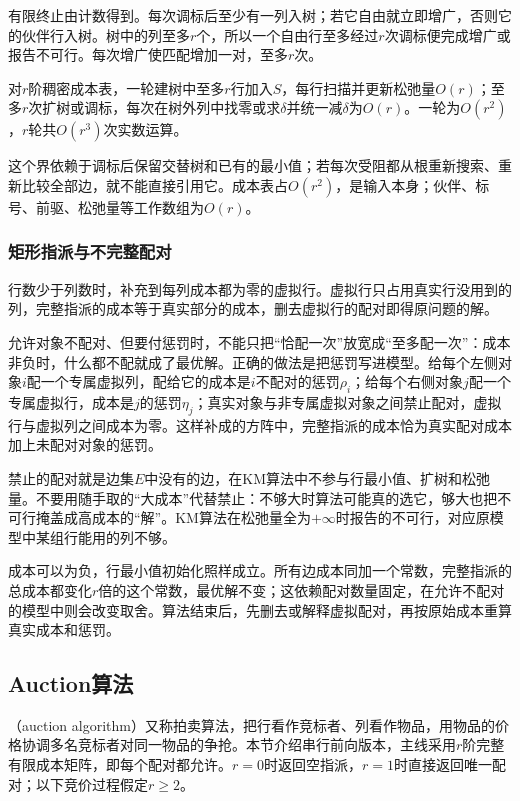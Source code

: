 有限终止由计数得到。每次调标后至少有一列入树；若它自由就立即增广，否则它的伙伴行入树。树中的列至多$r$个，所以一个自由行至多经过$r$次调标便完成增广或报告不可行。每次增广使匹配增加一对，至多$r$次。

对$r$阶稠密成本表，一轮建树中至多$r$行加入$S$，每行扫描并更新松弛量$O(r)$；至多$r$次扩树或调标，每次在树外列中找零或求$\delta$并统一减$\delta$为$O(r)$。一轮为$O(r^2)$，$r$轮共$O(r^3)$次实数运算。

这个界依赖于调标后保留交替树和已有的最小值；若每次受阻都从根重新搜索、重新比较全部边，就不能直接引用它。成本表占$O(r^2)$，是输入本身；伙伴、标号、前驱、松弛量等工作数组为$O(r)$。

\subsubsection{矩形指派与不完整配对}
\label{sec:graph-opt-assign-rectangular}

行数少于列数时，补充到每列成本都为零的虚拟行。虚拟行只占用真实行没用到的列，完整指派的成本等于真实部分的成本，删去虚拟行的配对即得原问题的解。

允许对象不配对、但要付惩罚时，不能只把“恰配一次”放宽成“至多配一次”：成本非负时，什么都不配就成了最优解。正确的做法是把惩罚写进模型。给每个左侧对象$i$配一个专属虚拟列，配给它的成本是$i$不配对的惩罚$\rho_i$；给每个右侧对象$j$配一个专属虚拟行，成本是$j$的惩罚$\eta_j$；真实对象与非专属虚拟对象之间禁止配对，虚拟行与虚拟列之间成本为零。这样补成的方阵中，完整指派的成本恰为真实配对成本加上未配对对象的惩罚。

禁止的配对就是边集$E$中没有的边，在KM算法中不参与行最小值、扩树和松弛量。不要用随手取的“大成本”代替禁止：不够大时算法可能真的选它，够大也把不可行掩盖成高成本的“解”。KM算法在松弛量全为$+\infty$时报告的不可行，对应原模型中某组行能用的列不够。

成本可以为负，行最小值初始化照样成立。所有边成本同加一个常数，完整指派的总成本都变化$r$倍的这个常数，最优解不变；这依赖配对数量固定，在允许不配对的模型中则会改变取舍。算法结束后，先删去或解释虚拟配对，再按原始成本重算真实成本和惩罚。

\subsection{Auction算法}
\label{sec:graph-opt-auction}

（auction algorithm）又称拍卖算法，把行看作竞标者、列看作物品，用物品的价格协调多名竞标者对同一物品的争抢。本节介绍串行前向版本，主线采用$r$阶完整有限成本矩阵，即每个配对都允许。$r=0$时返回空指派，$r=1$时直接返回唯一配对；以下竞价过程假定$r\geq2$。

